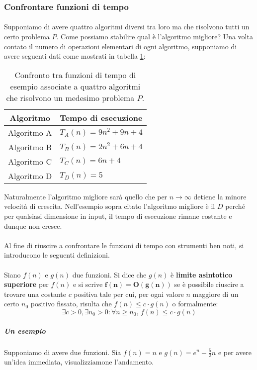 \documentclass[11pt,a4paper,oneside]{article}
\begin{document}
\subsubsection{Confrontare funzioni di tempo}
\paragraph*{}Supponiamo di avere quattro algoritmi diversi tra loro ma che risolvono tutti un certo problema $P$. Come possiamo stabilire qual è l'algoritmo migliore? Una volta contato il numero di operazioni elementari di ogni algoritmo, supponiamo di avere seguenti dati come mostrati in tabella \ref{tab:algos}:

\begin{table}[h]
	\centering
	\begin{tabular}{|c|l|}
		\hline
		\textbf{Algoritmo}&\textbf{Tempo di esecuzione}\\\hline 
		Algoritmo A &  $T_A(n) = 9n^2+9n+4$ \\ 
		Algoritmo B &  $T_B(n) = 2n^2+6n+4$\\ 
		Algoritmo C &  $T_C(n) = 6n+4$\\ 
		Algoritmo D &  $T_D(n) = 5$ \\ \hline
	\end{tabular}
	\caption{Confronto tra funzioni di tempo di esempio associate a quattro algoritmi che risolvono un medesimo problema $P$.}
	\label{tab:algos}
\end{table}

Naturalmente l'algoritmo migliore sarà quello che per $n \to \infty$ detiene la minore velocità di crescita. Nell'esempio sopra citato l'algoritmo migliore è il $D$ perché per qualsiasi dimensione in input, il tempo di esecuzione rimane costante e dunque non cresce.

\paragraph*{} Al fine di riuscire a confrontare le funzioni di tempo con strumenti ben noti, si introducono le seguenti definizioni.
\paragraph{} Siano $f(n)$ e $g(n)$ due funzioni. Si dice che $g(n)$ è \textbf{limite asintotico superiore} per $f(n)$ e si scrive $\bm{f(n) = O(g(n))}$ se è possibile riuscire a trovare una costante $c$ positiva tale per cui, per ogni valore $n$ maggiore di un certo $n_0$ positivo fissato, risulta che $f(n) \leq  c\cdot g(n)$ o formalmente: $$\exists c>0, \exists n_0 > 0 : \forall n \geq n_0,\,f(n) \leq c\cdot g(n)$$
\subparagraph*{Un esempio} Supponiamo di avere due funzioni. Sia $f(n) = n$ e $g(n) = e^n-\frac{5}{2}n$ e per avere un'idea immediata, visualizziamone l'andamento.
\end{document}
